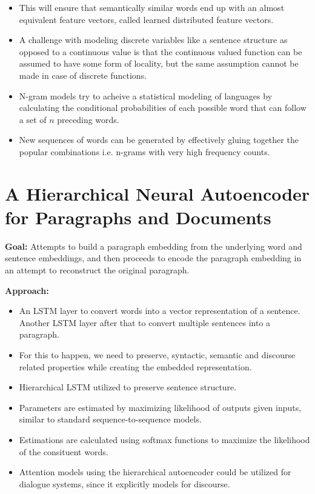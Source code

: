 \documentclass[11pt,a4paper]{article}
\begin{document}
\begin{itemize}
    \item 
    This will ensure that semantically similar words end up with an almost equivalent feature vectors, called learned distributed feature vectors.
    \item 
    A challenge with modeling discrete variables like a sentence structure as opposed to a continuous value is that the continuous valued function can be assumed to have some form of locality, but the same assumption cannot be made in case of discrete functions.
    \item 
    N-gram models try to acheive a statistical modeling of languages by calculating the conditional probabilities of each possible word that can follow a set of $n$ preceding words.
    \item 
    New sequences of words can be generated by effectively gluing together the popular combinations i.e. n-grams with very high frequency counts.
  \end{itemize}



\section{A Hierarchical Neural Autoencoder for Paragraphs and Documents} %
\label{sec:a_hierarchical_neural_autoencoder_for_paragraphs_and_documents}

  \textbf{Goal:}
  Attempts to build a paragraph embedding from the underlying word and sentence embeddings, and then proceeds to encode the paragraph embedding in an attempt to reconstruct the original paragraph.

  \textbf{Approach:}
  \begin{itemize}
    \item 
    An LSTM layer to convert words into a vector representation of a sentence. Another LSTM layer after that to convert multiple sentences into a paragraph.
    \item 
    For this to happen, we need to preserve, syntactic, semantic and discourse related properties while creating the embedded representation.
    \item 
    Hierarchical LSTM utilized to preserve sentence structure.
    \item 
    Parameters are estimated by maximizing likelihood of outputs given inputs, similar to standard sequence-to-sequence models.
    \item 
    Estimations are calculated using softmax functions to maximize the likelihood of the consituent words.
    \item 
    Attention models using the hierarchical autoencoder could be utilized for dialogue systems, since it explicitly models for discourse.
  \end{itemize}
\end{document}

